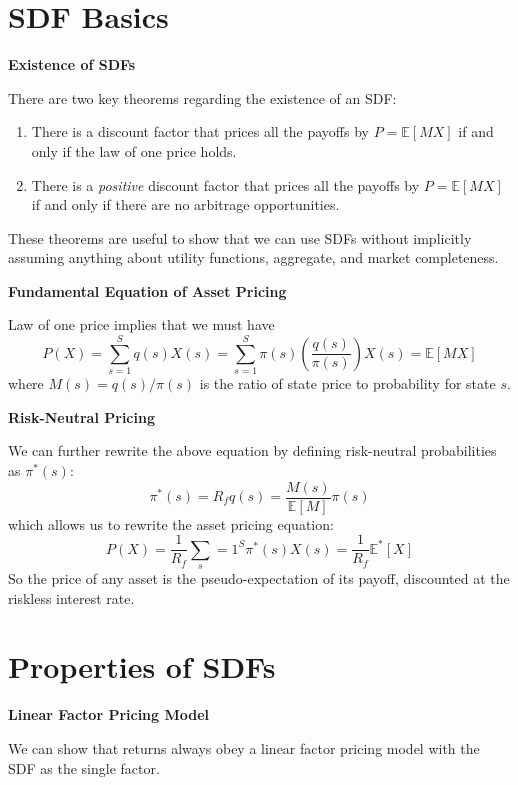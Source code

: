 \documentclass[
]{book}
\providecommand{\tightlist}{%
  \setlength{\itemsep}{0pt}\setlength{\parskip}{0pt}}
\begin{document}
\hypertarget{sdf-basics}{%
\section{SDF Basics}\label{sdf-basics}}

\textbf{Existence of SDFs}

There are two key theorems regarding the existence of an SDF:

\begin{enumerate}
\def\labelenumi{\arabic{enumi}.}
\tightlist
\item
  There is a discount factor that prices all the payoffs by \(P=\mathbb{E}[MX]\) if and only if the law of one price holds.
\item
  There is a \emph{positive} discount factor that prices all the payoffs by \(P = \mathbb{E}[MX]\) if and only if there are no arbitrage opportunities.
\end{enumerate}

These theorems are useful to show that we can use SDFs without implicitly assuming anything about utility functions, aggregate, and market completeness.

\textbf{Fundamental Equation of Asset Pricing}

Law of one price implies that we must have
\[
P(X) = \sum_{s=1}^S q(s)X(s) = \sum_{s=1}^S \pi(s)\left(\frac{q(s)}{\pi(s)}\right)X(s) = \mathbb{E}[MX]
\]
where \(M(s) = q(s) / \pi(s)\) is the ratio of state price to probability for state \(s\).

\textbf{Risk-Neutral Pricing}

We can further rewrite the above equation by defining risk-neutral probabilities as \(\pi^*(s)\):
\[
\pi^*(s) = R_f q(s) =\frac{M(s)}{\mathbb{E}[M]} \pi(s)
\]
which allows us to rewrite the asset pricing equation:
\[
P(X) = \frac{1}{R_f} \sum_s=1^S \pi^*(s) X(s) = \frac{1}{R_f} \mathbb{E}^*[X]
\]
So the price of any asset is the pseudo-expectation of its payoff, discounted at the riskless interest rate.

\hypertarget{properties-of-sdfs}{%
\section{Properties of SDFs}\label{properties-of-sdfs}}

\textbf{Linear Factor Pricing Model}

We can show that returns always obey a linear factor pricing model with the SDF as the single factor.
\end{document}

